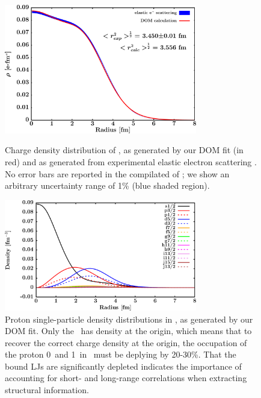 \begin{figure}[tb]
    \centering
    \includegraphics[width=0.75\textwidth]{figures/ca40_chargeDensity.png}
    \caption[Proton single-particle density distributions in \caForty]
    {
        Charge density distribution of \caForty, as generated
        by our DOM fit (in red) and as generated from experimental
        elastic electron scattering \cite{DeVries1987}. No error bars are
        reported in the compilated of \cite{DeVries1987}; we show an
        arbitrary uncertainty range of 1\% (blue shaded region).
    }
    \label{Ca40ChargeDensity}
    \vspace{16pt}
    \includegraphics[width=0.75\textwidth]{figures/ca40_protonLJDensityDist.png}
    \caption[Proton single-particle density distributions in \caForty]
    {
        Proton single-particle density distributions in \caForty, as generated
        by our DOM fit. Only the \sOne\ has density at the origin, which
        means that to recover the correct charge density at the origin, the
        occupation of the proton 0\sOne\ and 1\sOne\ in \caForty\ must be
        deplying by 20-30\%. That the bound LJs are significantly
        depleted indicates the importance of
        accounting for short- and long-range correlations when extracting
        structural information.
    }
    \label{s1Depletion}
    \label{Ca40ChargeAndLJDensities}
\end{figure}

